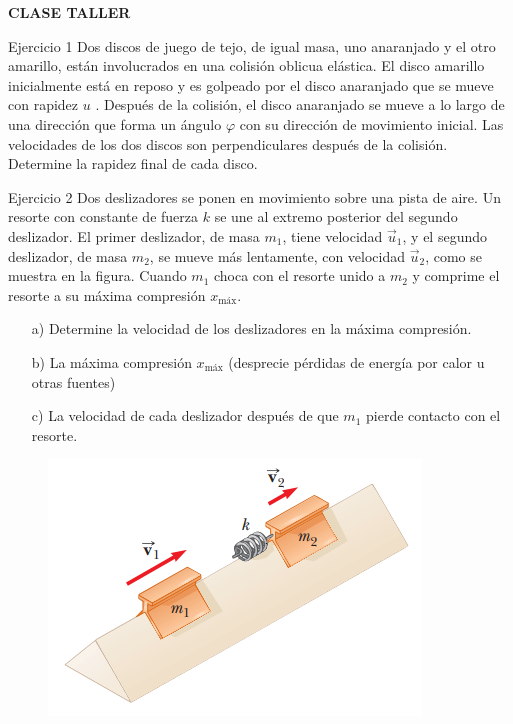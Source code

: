 \begin{frame}
    \Huge \begin{center}
        \textbf{CLASE TALLER}
    \end{center}
\end{frame}

\begin{frame}{Ejercicio 1}
    Dos discos de juego de tejo, de igual masa, uno anaranjado y
el otro amarillo, están involucrados en una colisión oblicua
elástica. El disco amarillo inicialmente está en reposo y es golpeado por el disco anaranjado que se mueve con rapidez $u$
.
Después de la colisión, el disco anaranjado se mueve a lo largo
de una dirección que forma un ángulo $\varphi$ con su dirección de
movimiento inicial. Las velocidades de los dos discos son perpendiculares después de la colisión. Determine la rapidez final
de cada disco.
\end{frame}

\begin{frame}{Ejercicio 2}
    Dos deslizadores se ponen en movimiento sobre una pista de
aire. Un resorte con constante de fuerza $k$ se une al extremo posterior del segundo deslizador. El primer deslizador, de
masa $m_1$, tiene velocidad $\vec{u}_1$, y el segundo deslizador, de masa
$m_2$, se mueve más lentamente, con velocidad $\vec{u}_2$, como se muestra en la figura. Cuando $m_1$ choca con el resorte unido
a $m_2$ y comprime el resorte a su máxima compresión $x_\text{máx}$.
\begin{itemize}
    \item[a)] Determine la velocidad de los deslizadores en la máxima compresión.
    \item[b)] La
máxima compresión $x_\text{máx}$ (desprecie pérdidas de energía por calor u otras fuentes)
\item[c)] La velocidad de cada deslizador
después de que $m_1$ pierde contacto con el resorte. 
\end{itemize}

\begin{figure}
    \centering
    \includegraphics[width=0.25\linewidth]{figures/deslizadores.png}
\end{figure}

\end{frame}

